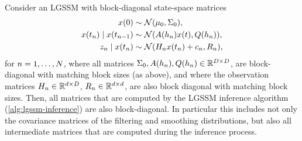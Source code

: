 \documentclass{mimosis}
\begin{document}
\begin{proposition}
Consider an LGSSM with block-diagonal state-space matrices
\begin{subequations}
\begin{align}
  \st(0) &\sim \N( \mean{0}, \cov{0} ), \\
  \st(t_\idxt) \mid \st(t_{\idxt-1}) &\sim \N( \transA(h_\idxt) \st(t), \transC(h_\idxt) ), \\
  \sobs_\idxt \mid \st(t_\idxt) &\sim \N( \obsA_\idxt \st(t_\idxt) + \obsb_\idxt, \obsC_\idxt ),
\end{align}
\end{subequations}
for \(n = 1, \dots, N\),
where all matrices
\(\Sigma_{0}, A(h_n), Q(h_n) \in \mathbb{R}^{D \times D}\),
are block-diagonal with matching block sizes (as above),
and where the observation matrices
\(H_n \in \mathbb{R}^{d \times D}\),
\(R_n \in \mathbb{R}^{d \times d}\),
are also block diagonal with matching block sizes.
Then, all matrices that are computed by the LGSSM inference algorithm (\ref{alg:lgssm-inference}) are also block-diagonal.
In particular this includes not only the covariance matrices of the filtering and smoothing distributions, but also all intermediate matrices that are computed during the inference process.
\label{prop:bd-conservation}
\end{proposition}
\end{document}

